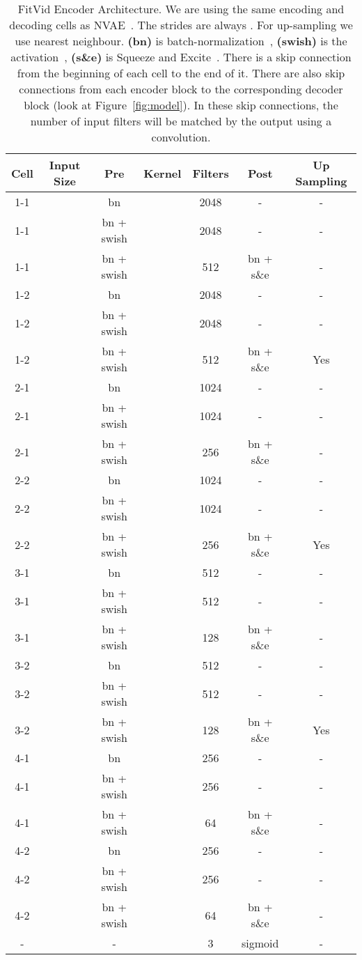 \documentclass{article}
\newcommand{\model}{FitVid\xspace}
\begin{document}
\begin{table}[!htp]\centering
\caption{\model Encoder Architecture. We are using the same encoding and decoding cells as NVAE~\cite{vahdat2020nvae}. The strides are always . For up-sampling we use nearest neighbour. \textbf{(bn)} is batch-normalization~\cite{ioffe2015batch}, \textbf{(swish)} is the activation~\cite{ramachandran2017searching}, \textbf{(s\&e)} is Squeeze and Excite~\cite{hu2018squeeze}. There is a skip connection from the beginning of each cell to the end of it. There are also skip connections from each encoder block to the corresponding decoder block (look at Figure~\ref{fig:model}). In these skip connections, the number of input filters will be matched by the output using a  convolution.}
\label{tab:decoder}
\scriptsize
\begin{tabular}{ccccccc}\toprule
Cell &Input Size &Pre &Kernel &Filters &Post &Up Sampling \\\midrule
1-1 & &bn & &2048 &- &- \\
1-1 & &bn + swish & &2048 &- &- \\
1-1 & &bn + swish & &512 &bn + s\&e &- \\
1-2 & &bn & &2048 &- &- \\
1-2 & &bn + swish & &2048 &- &- \\
1-2 & &bn + swish & &512 &bn + s\&e &Yes \\
2-1 & &bn & &1024 &- &- \\
2-1 & &bn + swish & &1024 &- &- \\
2-1 & &bn + swish & &256 &bn + s\&e &- \\
2-2 & &bn & &1024 &- &- \\
2-2 & &bn + swish & &1024 &- &- \\
2-2 & &bn + swish & &256 &bn + s\&e &Yes \\
3-1 & &bn & &512 &- &- \\
3-1 & &bn + swish & &512 &- &- \\
3-1 & &bn + swish & &128 &bn + s\&e &- \\
3-2 & &bn & &512 &- &- \\
3-2 & &bn + swish & &512 &- &- \\
3-2 & &bn + swish & &128 &bn + s\&e &Yes \\
4-1 & &bn & &256 &- &- \\
4-1 & &bn + swish & &256 &- &- \\
4-1 & &bn + swish & &64 &bn + s\&e &- \\
4-2 & &bn & &256 &- &- \\
4-2 & &bn + swish & &256 &- &- \\
4-2 & &bn + swish & &64 &bn + s\&e &- \\
-& &- & &3 &sigmoid &- \\
\bottomrule
\end{tabular}
\end{table}
\end{document}
